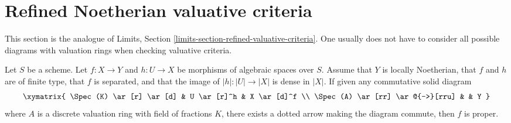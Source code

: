 \section{Refined Noetherian valuative criteria}
\label{section-refined-valuative-criteria}

\noindent
This section is the analogue of
Limits, Section \ref{limits-section-refined-valuative-criteria}.
One usually does not have to consider all possible diagrams with
valuation rings when checking valuative criteria.

\begin{lemma}
\label{lemma-refined-valuative-criterion-proper}
Let $S$ be a scheme. Let $f : X \to Y$ and $h : U \to X$ be
morphisms of algebraic spaces over $S$. Assume that $Y$ is
locally Noetherian, that $f$ and $h$ are of finite type,
that $f$ is separated, and that the image of $|h| : |U| \to |X|$
is dense in $|X|$. If given any commutative solid diagram
$$
\xymatrix{
\Spec(K) \ar[r] \ar[d] & U \ar[r]^h & X \ar[d]^f \\
\Spec(A) \ar[rr] \ar@{-->}[rru] & & Y
}
$$
where $A$ is a discrete valuation ring with field of fractions $K$, there
exists a dotted arrow making the diagram commute, then $f$ is proper.
\end{lemma}

